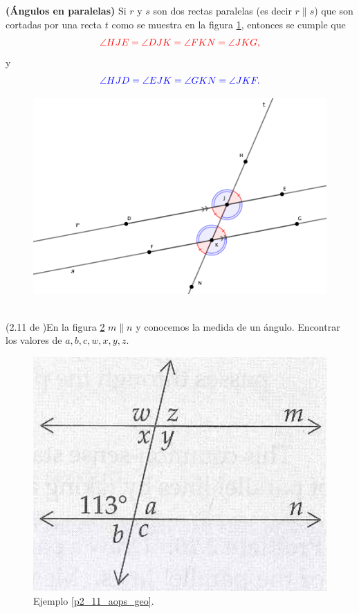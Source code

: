 \begin{theorem} \textbf{(Ángulos en paralelas)}
	Si $r$ y $s$ son dos rectas paralelas (es decir $r\parallel s$) que son cortadas por una recta $t$ como se muestra en la figura \ref{paralelas_angulos_iguales_marca_color}, entonces se cumple que
	\[
	\color{red} \angle HJE =  \angle DJK = \angle FKN = \angle JKG,
	\]
	y 
	\[
	\color{blue}\angle HJD =  \angle EJK = \angle GKN = \angle JKF.
	\]
	
	\begin{figure}[H]
		\centering
		\includegraphics[width=0.7\linewidth]{Geometria/imgs/paralelas_angulos_iguales_marca_color}
		\caption{}
		\label{paralelas_angulos_iguales_marca_color}
	\end{figure}
\end{theorem}

\begin{ejemplo}{\ \\}
	\label{p2_11_aops_geo} (2.11 de \cite{Aops_Geometria})En la figura \ref{aopsgeo_2_11_pag25} $m\parallel n$ y conocemos la medida de un ángulo. Encontrar los valores de $a,b,c,w,x,y,z$.
	\begin{figure}[H]
		\centering
		\includegraphics[width=0.4\linewidth]{Geometria/imgs/aopsgeo_2_11_pag25}
		\caption{Ejemplo \ref{p2_11_aops_geo}.}
		\label{aopsgeo_2_11_pag25}
	\end{figure}
\end{ejemplo}

